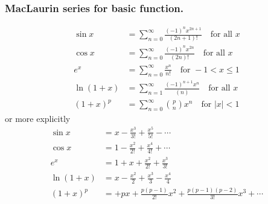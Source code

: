 \documentclass[../../../main.tex]{subfiles}
\begin{document}
\subsubsection{MacLaurin series for basic function.}
\begin{align*}
    \sin x&= \sum_{n=0}^{\infty}\frac{(-1)^nx^{2n+1}}{(2n+1)!} \quad \text{for all }x\\
    \cos x&= \sum_{n=0}^{\infty}\frac{(-1)^nx^{2n}}{(2n)!}\quad \text{for all }x\\
    e^x&= \sum_{n=0}^{\infty}\frac{x^{n}}{n!}               \quad\text{for }-1<x\leq1\\
    \ln (1+x)&= \sum_{n=1}^{\infty} \frac{(-1)^{n+1}x^{n}}{(n)} \quad \text{for all }x\\
    (1+x)^p&=\sum_{n=0}^{\infty}\binom{p}{n}x^n \quad \text{for }|x|<1
\end{align*}
or more explicitly
\begin{align*}
    \sin x&=x-\frac{x^3}{3!}+\frac{x^5}{5!}-\cdots\\
    \cos x&= 1-\frac{x^2}{2!}+\frac{x^4}{4!}+\cdots\\
    e^x&=1+x+\frac{x^2}{2!}+\frac{x^3}{3!} \\
    \ln (1+x)&=x-\frac{x^2}{2}+\frac{x^3}{3}-\frac{x^4}{4}\\
    (1+x)^p&=+px+\frac{p(p-1)}{2!}x^2 +\frac{p(p-1)(p-2)}{3!}x^3+\cdots
\end{align*}
\end{document}

